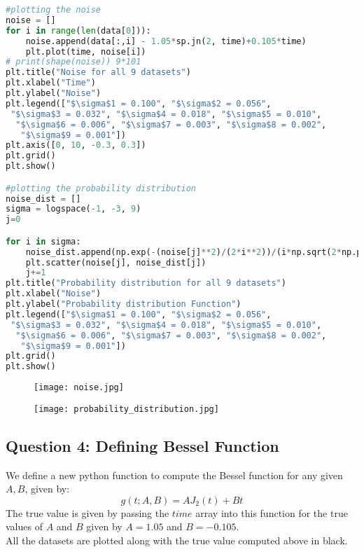 \documentclass[11pt, a4paper]{article}
\begin{document}
\begin{lstlisting}[language = Python]
#plotting the noise
noise = []
for i in range(len(data[0])):
    noise.append(data[:,i] - 1.05*sp.jn(2, time)+0.105*time)
    plt.plot(time, noise[i])
# print(shape(noise)) 9*101
plt.title("Noise for all 9 datasets")
plt.xlabel("Time")
plt.ylabel("Noise")
plt.legend(["$\sigma$1 = 0.100", "$\sigma$2 = 0.056",
 "$\sigma$3 = 0.032", "$\sigma$4 = 0.018", "$\sigma$5 = 0.010",
  "$\sigma$6 = 0.006", "$\sigma$7 = 0.003", "$\sigma$8 = 0.002",
   "$\sigma$9 = 0.001"])
plt.axis([0, 10, -0.3, 0.3])
plt.grid()
plt.show()

#plotting the probability distribution
noise_dist = []
sigma = logspace(-1, -3, 9)
j=0

for i in sigma:
    noise_dist.append(np.exp(-(noise[j]**2)/(2*i**2))/(i*np.sqrt(2*np.pi)))
    plt.scatter(noise[j], noise_dist[j])
    j+=1
plt.title("Probability distribution for all 9 datasets")
plt.xlabel("Noise")
plt.ylabel("Probability distribution Function")
plt.legend(["$\sigma$1 = 0.100", "$\sigma$2 = 0.056",
 "$\sigma$3 = 0.032", "$\sigma$4 = 0.018", "$\sigma$5 = 0.010",
  "$\sigma$6 = 0.006", "$\sigma$7 = 0.003", "$\sigma$8 = 0.002",
   "$\sigma$9 = 0.001"])
plt.grid()
plt.show()

\end{lstlisting}

\begin{figure}[H]
     \centering
     \texttt{[image: noise.jpg]}
\end{figure}

\begin{figure}[H]
     \centering
     \texttt{[image: probability\_distribution.jpg]}
\end{figure}




\subsection{Question 4: Defining Bessel Function}
We define a new python function to compute the Bessel function for any given $A, B$, given by:
\[g(t;A,B) = AJ_2(t) + Bt\]
The true value is given by passing the $time$ array into this function for the true values of $A$ and $B$ given by $A = 1.05$ and $B = -0.105$. \\ All the datasets are plotted along with the true value computed above in black.\\
\end{document}
